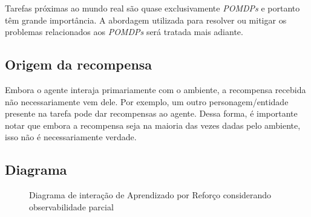 \documentclass{article}
\begin{document}
            Tarefas próximas ao mundo real são quase exclusivamente \emph{POMDPs} e portanto têm grande importância. A abordagem utilizada para resolver ou mitigar os problemas relacionados aos \emph{POMDPs} será tratada mais adiante.

        \subsection{Origem da recompensa}
        
            Embora o agente interaja primariamente com o ambiente, a recompensa recebida não necessariamente vem dele. Por exemplo, um outro personagem/entidade presente na tarefa pode dar recompensas ao agente. Dessa forma, é importante notar que embora a recompensa seja na maioria das vezes dadas pelo ambiente, isso não é necessariamente verdade.

        \subsection{Diagrama}

            \begin{figure}[ht]
                \centering
                \rlinteractionpomdp
                \caption{Diagrama de interação de Aprendizado por Reforço considerando observabilidade parcial}
                \label{diag:po-rl}
            \end{figure}
\end{document}
